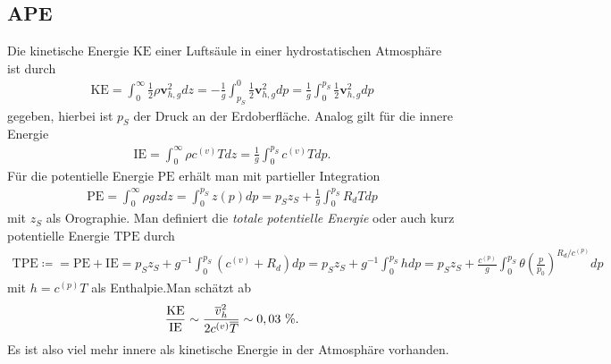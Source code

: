 \documentclass{book}
\newcommand\newoverline[1]{%
\overline{#1}}
\newcommand{\PE}{\text{PE}}
\newcommand{\KE}{\text{KE}}
\newcommand{\IE}{\text{IE}}
\newcommand{\TPE}{\text{TPE}}
\begin{document}
\subsection{APE}
\label{sec:ape}

Die kinetische Energie $\KE$ einer Luftsäule in einer hydrostatischen Atmosphäre ist durch
%
\begin{eqnarray}
\KE = \int_0^{\infty}\frac{1}{2}\rho\mathbf{v}_{h, g}^2dz = -\frac{1}{g}\int_{p_S}^0\frac{1}{2}\mathbf{v}_{h, g}^2dp = \frac{1}{g}\int_0^{p_S}\frac{1}{2}\mathbf{v}_{h, g}^2dp
\end{eqnarray}
%
gegeben, hierbei ist $p_S$ der Druck an der Erdoberfläche. Analog gilt für die innere Energie
%
\begin{eqnarray}
\IE = \int_0^\infty\rho c^{(v)}Tdz = \frac{1}{g}\int_{0}^{p_S}c^{(v)}Tdp.
\end{eqnarray}
%
Für die potentielle Energie $\PE$ erhält man mit partieller Integration
%
\begin{eqnarray}
\PE = \int_0^\infty\rho gzdz = \int_0^{p_S}z\left(p\right)dp = p_Sz_S + \frac{1}{g}\int_0^{p_S}R_dTdp
\end{eqnarray}
%
mit $z_S$ als Orographie. Man definiert die \textit{totale potentielle Energie} oder auch kurz potentielle Energie $\TPE$ durch
%
\begin{eqnarray}
\TPE \coloneqq = \PE + \IE = p_Sz_S + g^{-1}\int_0^{p_S}\left(c^{(v)} + R_d\right)dp = p_Sz_S + g^{-1}\int_0^{p_S}hdp = p_Sz_S + \frac{c^{(p)}}{g}\int_0^{p_S}\theta\left(\frac{p}{p_0}\right)^{R_d/c^{(p)}}dp\label{eq:tpe_id_1}
\end{eqnarray}
%
mit $h = c^{(p)}T$ als Enthalpie.Man schätzt ab
%
\begin{eqnarray}
\frac{\KE}{\IE} \sim \frac{\newoverline{v}_h^2}{2c^{(v)}\newoverline{T}} \sim 0, 03\text{ \%}.
\end{eqnarray}
%
Es ist also viel mehr innere als kinetische Energie in der Atmosphäre vorhanden.
\end{document}
